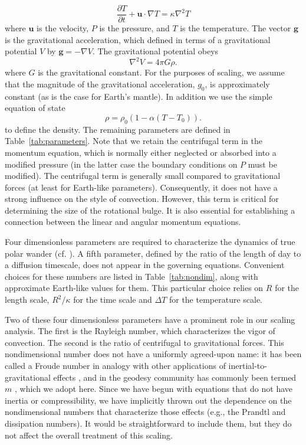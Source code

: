 \documentclass[preprint,12pt,authoryear]{elsarticle}
\begin{document}
\begin{equation}
\frac{\partial T}{\partial t} + \mathbf{u} \cdot \nabla T = \kappa \nabla^2 T
\label{eq:energy}
\end{equation}
where $\mathbf{u}$ is the velocity, $P$ is the pressure, and $T$ is the temperature.
The vector $\mathbf{g}$ is the gravitational acceleration, 
which defined in terms of a gravitational potential $V$ by $\mathbf{g} = -\nabla V$. 
The gravitational potential obeys 
\begin{equation}
\nabla^2 V = 4 \pi G \rho.
\end{equation}
where $G$ is the gravitational constant. 
For the purposes of scaling, we assume that the magnitude of the gravitational acceleration, $g_0$, is approximately constant (as is the case for Earth's mantle).
In addition we use the simple equation of state
\begin{equation}
\rho = \rho_0 \left( 1 - \alpha (T-T_0) \right).
\label{eq:eos}
\end{equation}
to define the density.
The remaining parameters are defined in Table~\ref{tab:parameters}.
Note that we retain the centrifugal term in the momentum equation, which is normally either neglected or absorbed into a modified pressure
(in the latter case the boundary conditions on $P$ must be modified).
The centrifugal term
is generally small compared to gravitational forces (at least for Earth-like parameters). Consequently, it does  not have a strong influence on the style of convection.
However, this term is critical for determining the size of the rotational bulge. It is also essential for establishing a connection between the linear and angular momentum equations.

Four dimensionless parameters are required to characterize the dynamics of true polar wander  (cf. \citet{barenblatt1996scaling}). A fifth parameter, defined  by the ratio of the length of day to a diffusion timescale, does not appear in the governing equations.
Convenient choices for these numbers are listed in Table~\ref{tab:nondim}, along with approximate Earth-like values for them. This particular choice relies on $R$ for the length scale, $R^2/\kappa$ for the time scale and $\Delta T$ for the temperature scale.

Two of these four dimensionless parameters have a prominent role in our scaling analysis. 
The first is the Rayleigh number, which characterizes the  vigor of convection. 
The second is the ratio of centrifugal to gravitational forces.
This nondimensional number does not have a uniformly agreed-upon name: 
it has been called a Froude number in analogy with other applications of inertial-to-gravitational effects \citep{mckenzie1968influence}, 
and in the geodesy community has commonly been termed $m$ \citep[e.g.][]{nakiboglu1982hydrostatic, chambat2010flattening}, which we adopt here.
Since we have begun with equations that do not have inertia or compressibility, we have implicitly thrown out the dependence on the nondimensional numbers that characterize those effects (e.g., the Prandtl and dissipation numbers).
It would be straightforward to include them, but they do not affect the overall treatment of this scaling.
\end{document}
